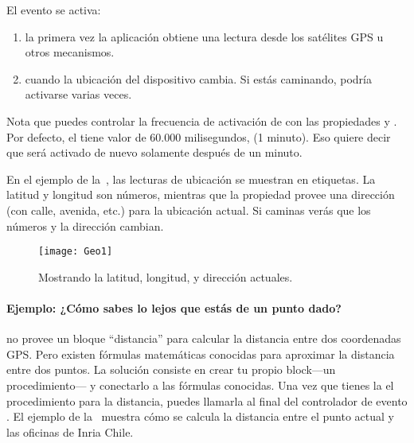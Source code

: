 El evento  se activa:

\begin{enumerate}

\item la primera vez la aplicación obtiene una lectura desde los
  satélites GPS u otros mecanismos.

\item cuando la ubicación del dispositivo cambia. Si estás caminando,
  podría activarse varias veces.

\end{enumerate}

Nota que puedes controlar la frecuencia de activación de
 con las propiedades
 y
. Por defecto, el
 tiene valor de 60.000 milisegundos,
(1 minuto). Eso quiere decir que  será
activado de nuevo solamente después de un minuto.

En el ejemplo de la~, las lecturas de ubicación se
muestran en etiquetas. La latitud y longitud son números, mientras que
la propiedad  provee una dirección (con
calle, avenida, etc.) para la ubicación actual. Si caminas verás que
los números y la dirección cambian.

\begin{figure}[H]
  \centering
  \texttt{[image: Geo1]}
  \caption{Mostrando la latitud, longitud, y dirección actuales.}
  \label{fig:Geo1}
\end{figure}

\paragraph{Ejemplo: ¿Cómo sabes lo lejos que estás de un punto dado?}

\AppInventor no provee un bloque ``distancia'' para calcular la
distancia entre dos coordenadas GPS. Pero existen fórmulas matemáticas
conocidas para aproximar la distancia entre dos puntos. La solución
consiste en crear tu propio block---un procedimiento--- y conectarlo a
las fórmulas conocidas. Una vez que tienes la el procedimiento para la
distancia, puedes llamarla al final del controlador de evento
. El ejemplo de la~ muestra
cómo se calcula la distancia entre el punto actual y las oficinas de
Inria Chile.

